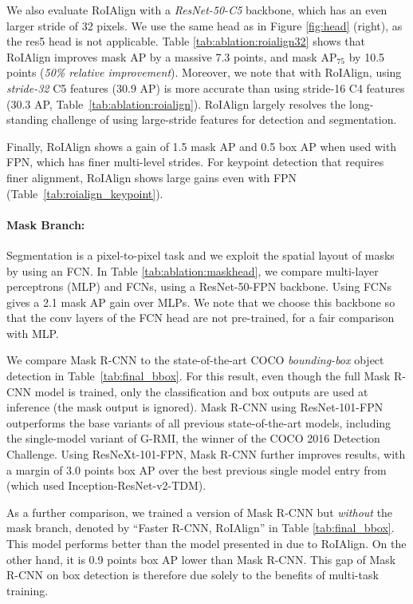 We also evaluate RoIAlign with a \emph{ResNet-50-C5} backbone, which has an even larger stride of 32 pixels. We use the same head as in Figure \ref{fig:head} (right), as the res5 head is not applicable. Table \ref{tab:ablation:roialign32} shows that RoIAlign improves mask AP by a massive 7.3 points, and mask AP$_{75}$ by 10.5 points (\emph{50\% relative improvement}). Moreover, we note that with RoIAlign, using \emph{stride-32} C5 features (30.9 AP) is more accurate than using stride-16 C4 features (30.3 AP, Table~\ref{tab:ablation:roialign}). RoIAlign largely resolves the long-standing challenge of using large-stride features for detection and segmentation.

Finally, RoIAlign shows a gain of 1.5 mask AP and 0.5 box AP when used with FPN, which has finer multi-level strides. For keypoint detection that requires finer alignment, RoIAlign shows large gains even with FPN (Table~\ref{tab:roialign_keypoint}).

\paragraph{Mask Branch:} Segmentation is a pixel-to-pixel task and we exploit the spatial layout of masks by using an FCN. In Table \ref{tab:ablation:maskhead}, we compare multi-layer perceptrons (MLP) and FCNs, using a ResNet-50-FPN backbone. Using FCNs gives a 2.1 mask AP gain over MLPs. We note that we choose this backbone so that the conv layers of the FCN head are not pre-trained, for a fair comparison with MLP.


We compare Mask R-CNN to the state-of-the-art COCO \emph{bounding-box} object detection in Table~\ref{tab:final_bbox}. For this result, even though the full Mask R-CNN model is trained, only the classification and box outputs are used at inference (the mask output is ignored). Mask R-CNN using ResNet-101-FPN outperforms the base variants of all previous state-of-the-art models, including the single-model variant of G-RMI, the winner of the COCO 2016 Detection Challenge. Using ResNeXt-101-FPN, Mask R-CNN further improves results, with a margin of 3.0 points box AP over the best previous single model entry from (which used Inception-ResNet-v2-TDM).

As a further comparison, we trained a version of Mask R-CNN but \emph{without} the mask branch, denoted by ``Faster R-CNN, RoIAlign'' in Table \ref{tab:final_bbox}. This model performs better than the model presented in due to RoIAlign. On the other hand, it is 0.9 points box AP lower than Mask R-CNN. This gap of Mask R-CNN on box detection is therefore due solely to the benefits of multi-task training.

